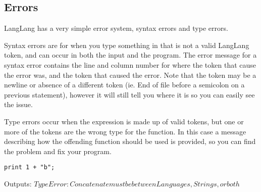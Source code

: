 \subsection{Errors}
\begin{normalsize}
LangLang has a very simple error system, syntax errors and type errors.

Syntax errors are for when you type something in that is not a valid LangLang token, and can occur in both the input and the program. The error message for a syntax error contains the line and column number for where the token that cause the error was, and the token that caused the error. Note that the token may be a newline or absence of a different token (ie. End of file before a semicolon on a previous statement), however it will still tell you where it is so you can easily see the issue.

Type errors occur when the expression is made up of valid tokens, but one or more of the tokens are the wrong type for the function. In this case a message describing how the offending function should be used is provided, so you can find the problem and fix your program.
\end{normalsize}

\begin{center}
\begin{minipage}{5cm}
\begin{verbatim}
print 1 + "b";
\end{verbatim}
\begin{normalsize}
Outputs: $ Type Error: Concatenate must be between Languages, Strings, or both $
\end{normalsize}
\end{minipage}
\end{center}